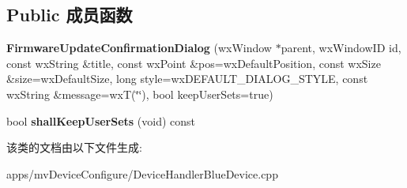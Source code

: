 \subsection*{Public 成员函数}
\begin{DoxyCompactItemize}
\item 
\hypertarget{class_firmware_update_confirmation_dialog_a552c30f311f9e044af59e33a2e7ae9a9}{{\bfseries Firmware\+Update\+Confirmation\+Dialog} (wx\+Window $\ast$parent, wx\+Window\+I\+D id, const wx\+String \&title, const wx\+Point \&pos=wx\+Default\+Position, const wx\+Size \&size=wx\+Default\+Size, long style=wx\+D\+E\+F\+A\+U\+L\+T\+\_\+\+D\+I\+A\+L\+O\+G\+\_\+\+S\+T\+Y\+L\+E, const wx\+String \&message=wx\+T(\char`\"{}\char`\"{}), bool keep\+User\+Sets=true)}\label{class_firmware_update_confirmation_dialog_a552c30f311f9e044af59e33a2e7ae9a9}

\item 
\hypertarget{class_firmware_update_confirmation_dialog_aca8b430bcbad7705d03b8d47f317abb6}{bool {\bfseries shall\+Keep\+User\+Sets} (void) const }\label{class_firmware_update_confirmation_dialog_aca8b430bcbad7705d03b8d47f317abb6}

\end{DoxyCompactItemize}


该类的文档由以下文件生成\+:\begin{DoxyCompactItemize}
\item 
apps/mv\+Device\+Configure/Device\+Handler\+Blue\+Device.\+cpp\end{DoxyCompactItemize}
